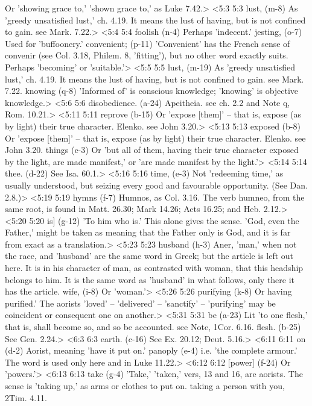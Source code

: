   Or 'showing grace to,' 'shown grace to,' as Luke 7.42.>
<5:3 5:3  lust, (m-8)  As 'greedy unsatisfied lust,' ch. 4.19. It means the lust of  having, but is not confined to gain. see Mark. 7.22.>
<5:4 5:4  foolish (n-4)  Perhaps 'indecent.'
  jesting, (o-7)  Used for 'buffoonery.'
  convenient; (p-11)  'Convenient' has the French sense of convenir (see Col.  3.18, Philem. 8, 'fitting'), but no other word exactly suits.  Perhaps 'becoming' or 'suitable.'>
<5:5 5:5  lust, (m-19)  As 'greedy unsatisfied lust,' ch. 4.19. It means the lust of  having, but is not confined to gain. see Mark. 7.22.
  knowing (q-8)  'Informed of' is conscious knowledge; 'knowing' is objective  knowledge.>
<5:6 5:6  disobedience. (a-24)  Apeitheia. see ch. 2.2 and Note q, Rom. 10.21.>
<5:11 5:11  reprove (b-15)  Or 'expose [them]' -- that is, expose (as by light) their  true character. Elenko. see John 3.20.>
<5:13 5:13  exposed (b-8)  Or 'expose [them]' -- that is, expose (as by light) their  true character. Elenko. see John 3.20.
  things (c-3)  Or 'but all of them, having their true character exposed by  the light, are made manifest,' or 'are made manifest by the  light.'>
<5:14 5:14  thee. (d-22)  See Isa. 60.1.>
<5:16 5:16  time, (e-3)  Not 'redeeming time,' as usually understood, but seizing  every good and favourable opportunity. (See Dan. 2.8.)>
<5:19 5:19  hymns (f-7)  Humnos, as Col. 3.16. The verb humneo, from the same  root, is found in Matt. 26.30; Mark 14.26; Acts 16.25; and Heb. 2.12.>
<5:20 5:20  is] (g-12)  'To him who is.' This alone gives the sense. 'God, even the  Father,' might be taken as meaning that the Father only is God,  and it is far from exact as a translation.>
<5:23 5:23  husband (h-3)  Aner, 'man,' when not the race, and 'husband' are the same  word in Greek; but the article is left out here. It is in his  character of man, as contrasted with woman, that this headship  belongs to him. It is the same word as 'husband' in what  follows, only there it has the article.
  wife, (i-8)  Or 'woman.'>
<5:26 5:26  purifying (k-8)  Or having purified.' The aorists 'loved' -- 'delivered' --  'sanctify' -- 'purifying' may be coincident or consequent one  on another.>
<5:31 5:31  be (a-23)  Lit 'to one flesh,' that is, shall become so, and so be  accounted. see Note, 1Cor. 6.16.
  flesh. (b-25)  See Gen. 2.24.>
<6:3 6:3  earth. (c-16)  See Ex. 20.12; Deut. 5.16.>
<6:11 6:11  on (d-2)  Aorist, meaning 'have it put on.'
  panoply (e-4)  i.e. 'the complete armour.' The word is used only here and in  Luke 11.22.>
<6:12 6:12  [power] (f-24)  Or 'powers.'>
<6:13 6:13  take (g-4)  'Take,' 'taken,' vers, 13 and 16, are aorists. The sense is  'taking up,' as arms or clothes to put on. taking a person with  you, 2Tim. 4.11.
